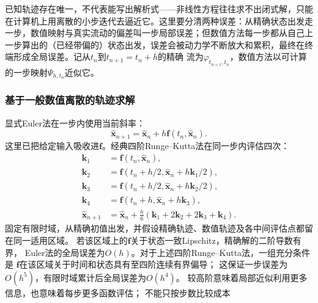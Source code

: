 已知轨迹存在唯一，不代表能写出解析式——非线性方程往往求不出闭式解，只能在计算机上用离散的小步迭代去逼近它。这里要分清两种误差：从精确状态出发走一步，数值映射与真实流动的偏差叫一步局部误差；但数值方法每一步都从自己上一步算出的（已经带偏的）状态出发，误差会被动力学不断放大和累积，最终在终端形成全局误差。记从$t_n$到$t_{n+1}=t_n+h$的精确
流为$\varphi_{t_{n+1},t_n}$，数值方法以可计算的一步映射$\Psi_{h,t_n}$近似它。

\subsubsection{基于一般数值离散的轨迹求解}
显式Euler法在一步内使用当前斜率：
\begin{equation}
  \widehat{\bm x}_{n+1}
  =\widehat{\bm x}_n+h\bm f(t_n,\widehat{\bm x}_n).
  \label{eq:dynamical-forward-euler}
\end{equation}
这里已把给定输入吸收进$\bm f$。经典四阶Runge--Kutta法在同一步内评估四次：
\begin{align*}
  \bm k_1&=\bm f(t_n,\widehat{\bm x}_n),\\
  \bm k_2&=\bm f(t_n+h/2,\widehat{\bm x}_n+h\bm k_1/2),\\
  \bm k_3&=\bm f(t_n+h/2,\widehat{\bm x}_n+h\bm k_2/2),\\
  \bm k_4&=\bm f(t_n+h,\widehat{\bm x}_n+h\bm k_3),\\
  \widehat{\bm x}_{n+1}
    &=\widehat{\bm x}_n+\frac h6(\bm k_1+2\bm k_2+2\bm k_3+\bm k_4).
\end{align*}
固定有限时域，从精确初值出发，并假设精确轨迹、数值轨迹及各中间评估点都留在同一适用区域。
若该区域上的$\bm f$关于状态一致Lipschitz，精确解的二阶导数有界，
Euler法的全局误差为$O(h)$。对于上述四阶Runge--Kutta法，一组充分条件是
$\bm f$在该区域关于时间和状态具有至四阶连续有界偏导；
这保证一步误差为$O(h^5)$，有限时域累计后全局误差为$O(h^4)$。
较高阶意味着局部近似利用更多信息，也意味着每步更多函数评估；
不能只按步数比较成本

